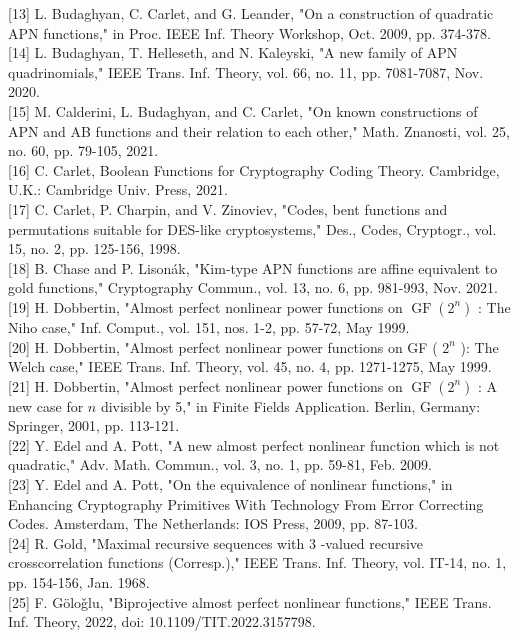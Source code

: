 \documentclass[10pt]{article}
\begin{document}
[13] L. Budaghyan, C. Carlet, and G. Leander, "On a construction of quadratic APN functions," in Proc. IEEE Inf. Theory Workshop, Oct. 2009, pp. 374-378.\\[0pt]
[14] L. Budaghyan, T. Helleseth, and N. Kaleyski, "A new family of APN quadrinomials," IEEE Trans. Inf. Theory, vol. 66, no. 11, pp. 7081-7087, Nov. 2020.\\[0pt]
[15] M. Calderini, L. Budaghyan, and C. Carlet, "On known constructions of APN and AB functions and their relation to each other," Math. Znanosti, vol. 25, no. 60, pp. 79-105, 2021.\\[0pt]
[16] C. Carlet, Boolean Functions for Cryptography Coding Theory. Cambridge, U.K.: Cambridge Univ. Press, 2021.\\[0pt]
[17] C. Carlet, P. Charpin, and V. Zinoviev, "Codes, bent functions and permutations suitable for DES-like cryptosystems," Des., Codes, Cryptogr., vol. 15, no. 2, pp. 125-156, 1998.\\[0pt]
[18] B. Chase and P. Lisonák, "Kim-type APN functions are affine equivalent to gold functions," Cryptography Commun., vol. 13, no. 6, pp. 981-993, Nov. 2021.\\[0pt]
[19] H. Dobbertin, "Almost perfect nonlinear power functions on $\operatorname{GF}\left(2^{n}\right)$ : The Niho case," Inf. Comput., vol. 151, nos. 1-2, pp. 57-72, May 1999.\\[0pt]
[20] H. Dobbertin, "Almost perfect nonlinear power functions on GF ( $2^{n}$ ): The Welch case," IEEE Trans. Inf. Theory, vol. 45, no. 4, pp. 1271-1275, May 1999.\\[0pt]
[21] H. Dobbertin, "Almost perfect nonlinear power functions on $\operatorname{GF}\left(2^{n}\right)$ : A new case for $n$ divisible by 5," in Finite Fields Application. Berlin, Germany: Springer, 2001, pp. 113-121.\\[0pt]
[22] Y. Edel and A. Pott, "A new almost perfect nonlinear function which is not quadratic," Adv. Math. Commun., vol. 3, no. 1, pp. 59-81, Feb. 2009.\\[0pt]
[23] Y. Edel and A. Pott, "On the equivalence of nonlinear functions," in Enhancing Cryptography Primitives With Technology From Error Correcting Codes. Amsterdam, The Netherlands: IOS Press, 2009, pp. 87-103.\\[0pt]
[24] R. Gold, "Maximal recursive sequences with 3 -valued recursive crosscorrelation functions (Corresp.)," IEEE Trans. Inf. Theory, vol. IT-14, no. 1, pp. 154-156, Jan. 1968.\\[0pt]
[25] F. Göloǧlu, "Biprojective almost perfect nonlinear functions," IEEE Trans. Inf. Theory, 2022, doi: 10.1109/TIT.2022.3157798.\\[0pt]
\end{document}
